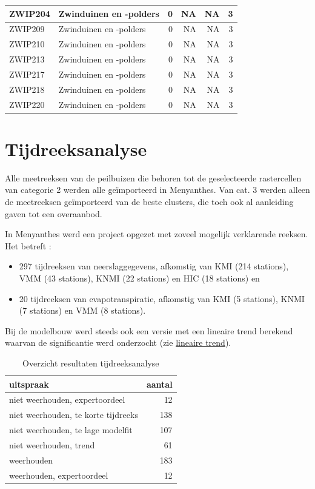 \documentclass[11pt,]{book}
\providecommand{\tightlist}{%
  \setlength{\itemsep}{0pt}\setlength{\parskip}{0pt}}
\begin{document}
\begin{table}
\begin{tabular}[t]{l|l|r|r|r|r}
\hline
ZWIP204 & Zwinduinen en -polders & 0 & NA & NA & 3\\
\hline
ZWIP209 & Zwinduinen en -polders & 0 & NA & NA & 3\\
\hline
ZWIP210 & Zwinduinen en -polders & 0 & NA & NA & 3\\
\hline
ZWIP213 & Zwinduinen en -polders & 0 & NA & NA & 3\\
\hline
ZWIP217 & Zwinduinen en -polders & 0 & NA & NA & 3\\
\hline
ZWIP218 & Zwinduinen en -polders & 0 & NA & NA & 3\\
\hline
ZWIP220 & Zwinduinen en -polders & 0 & NA & NA & 3\\
\hline
\end{tabular}
\end{table}

\section{Tijdreeksanalyse}\label{tijdreeksanalyse_uitvoering}

Alle meetreeksen van de peilbuizen die behoren tot de geselecteerde
rastercellen van categorie 2 werden alle geïmporteerd in Menyanthes. Van
cat. 3 werden alleen de meetreeksen geïmporteerd van de beste clusters,
die toch ook al aanleiding gaven tot een overaanbod.

In Menyanthes werd een project opgezet met zoveel mogelijk verklarende
reeksen. Het betreft :

\begin{itemize}
\tightlist
\item
  297 tijdreeksen van neerslaggegevens, afkomstig van KMI (214
  stations), VMM (43 stations), KNMI (22 stations) en HIC (18 stations)
  en
\item
  20 tijdreeksen van evapotranspiratie, afkomstig van KMI (5 stations),
  KNMI (7 stations) en VMM (8 stations).
\end{itemize}

Bij de modelbouw werd steeds ook een versie met een lineaire trend
berekend waarvan de significantie werd onderzocht (zie
\protect\hyperlink{lintrend}{lineaire trend}).

\begin{table}

\caption{\label{tab:read-results-menyanthes}Overzicht resultaten tijdreeksanalyse}
\centering
\begin{tabular}[t]{l|r}
\hline
uitspraak & aantal\\
\hline
niet weerhouden, expertoordeel & 12\\
\hline
niet weerhouden, te korte tijdreeks & 138\\
\hline
niet weerhouden, te lage modelfit & 107\\
\hline
niet weerhouden, trend & 61\\
\hline
weerhouden & 183\\
\hline
weerhouden, expertoordeel & 12\\
\hline
\end{tabular}
\end{table}
\end{document}
